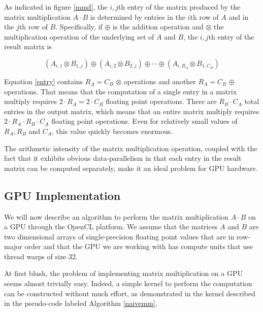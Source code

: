 \documentclass[12pt,twoside]{reedthesis}
\begin{document}
As indicated in figure \ref{mmd}, the $i,j$th entry of the matrix produced by the matrix multiplication $A \cdot B$ is determined by entries in the $i$th row of $A$ and in the $j$th row of $B$. Specifically, if $\oplus$ is the addition operation and $\otimes$ the multiplication operation of the underlying set of $A$ and $B$, the $i,j$th entry of the result matrix is

\begin{equation}
\label{entry}
(A_{i,1} \otimes B_{1,j}) \oplus (A_{i,2} \otimes B_{2,j}) \oplus \cdots \oplus (A_{i,R_A} \otimes B_{1,C_B})
\end{equation}

Equation \ref{entry} contains $R_A = C_B$ $\otimes$ operations and another $R_A=C_B$ $\oplus$ operations. That means that the computation of a single entry in a matrix multiply requires $2 \cdot R_A =  2 \cdot C_B$ floating point operations. There are $R_B \cdot C_A$ total entries in the output matrix, which means that an entire matrix multiply requires $2 \cdot R_A \cdot R_B \cdot C_A$ floating point operations. Even for relatively small values of $R_A, R_B$ and $C_A$, this value quickly becomes enormous.

The arithmetic intensity of the matrix multiplication operation, coupled with the fact that it exhibits obvious data-parallelism in that each entry in the result matrix can be computed separately, make it an ideal problem for GPU hardware.

\subsection{GPU Implementation}

We will now describe an algorithm to perform the matrix multiplication $A \cdot B$ on a GPU through the OpenCL platform. We assume that the matrices $A$ and $B$ are two dimensional arrays of single-precision floating point values that are in row-major order and that the GPU we are working with has compute units that use thread warps of size 32.

At first blush, the problem of implementing matrix multiplication on a GPU seems almost trivially easy. Indeed, a simple kernel to perform the computation can be constructed without much effort, as demonstrated in the kernel described in the pseudo-code labeled Algorithm \ref{naivemm}.
\end{document}
